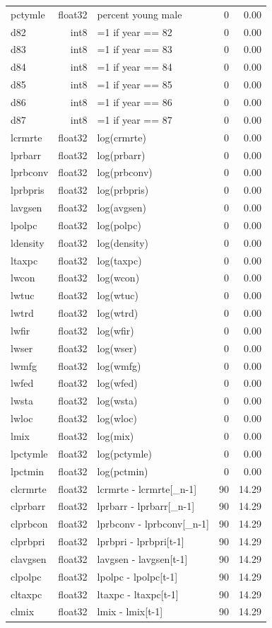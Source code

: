 \begin{longtable}{p{} r p{} r r}
pctymle & float32 & percent young male & 0 & 0.00 \\
d82 & int8 & =1 if year == 82 & 0 & 0.00 \\
d83 & int8 & =1 if year == 83 & 0 & 0.00 \\
d84 & int8 & =1 if year == 84 & 0 & 0.00 \\
d85 & int8 & =1 if year == 85 & 0 & 0.00 \\
d86 & int8 & =1 if year == 86 & 0 & 0.00 \\
d87 & int8 & =1 if year == 87 & 0 & 0.00 \\
lcrmrte & float32 & log(crmrte) & 0 & 0.00 \\
lprbarr & float32 & log(prbarr) & 0 & 0.00 \\
lprbconv & float32 & log(prbconv) & 0 & 0.00 \\
lprbpris & float32 & log(prbpris) & 0 & 0.00 \\
lavgsen & float32 & log(avgsen) & 0 & 0.00 \\
lpolpc & float32 & log(polpc) & 0 & 0.00 \\
ldensity & float32 & log(density) & 0 & 0.00 \\
ltaxpc & float32 & log(taxpc) & 0 & 0.00 \\
lwcon & float32 & log(wcon) & 0 & 0.00 \\
lwtuc & float32 & log(wtuc) & 0 & 0.00 \\
lwtrd & float32 & log(wtrd) & 0 & 0.00 \\
lwfir & float32 & log(wfir) & 0 & 0.00 \\
lwser & float32 & log(wser) & 0 & 0.00 \\
lwmfg & float32 & log(wmfg) & 0 & 0.00 \\
lwfed & float32 & log(wfed) & 0 & 0.00 \\
lwsta & float32 & log(wsta) & 0 & 0.00 \\
lwloc & float32 & log(wloc) & 0 & 0.00 \\
lmix & float32 & log(mix) & 0 & 0.00 \\
lpctymle & float32 & log(pctymle) & 0 & 0.00 \\
lpctmin & float32 & log(pctmin) & 0 & 0.00 \\
clcrmrte & float32 & lcrmrte - lcrmrte[\_n-1] & 90 & 14.29 \\
clprbarr & float32 & lprbarr - lprbarr[\_n-1] & 90 & 14.29 \\
clprbcon & float32 & lprbconv - lprbconv[\_n-1] & 90 & 14.29 \\
clprbpri & float32 & lprbpri - lprbpri[t-1] & 90 & 14.29 \\
clavgsen & float32 & lavgsen - lavgsen[t-1] & 90 & 14.29 \\
clpolpc & float32 & lpolpc - lpolpc[t-1] & 90 & 14.29 \\
cltaxpc & float32 & ltaxpc - ltaxpc[t-1] & 90 & 14.29 \\
clmix & float32 & lmix - lmix[t-1] & 90 & 14.29 \\
\bottomrule
\end{longtable}
